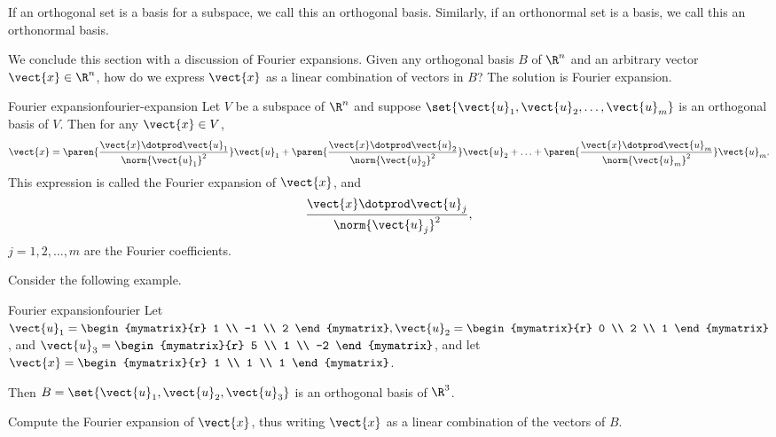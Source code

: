 If an orthogonal set is a basis for a subspace, we call this an
orthogonal basis. Similarly, if an orthonormal set is a basis, we call
this an orthonormal basis.

We conclude this section with a discussion of Fourier expansions. Given any orthogonal basis $B$ of $\R^n$ and an arbitrary vector $\vect{x} \in \R^n$, how do we express $\vect{x}$ as a linear combination of vectors in $B$? The solution is Fourier expansion. 

\begin{theorem}{Fourier expansion}{fourier-expansion}
Let $V$ be a subspace of $\R^n$ and suppose $\set{\vect{u}_1, \vect{u}_2, \ldots, \vect{u}_m}$
is an orthogonal basis of $V$. 
Then for any $\vect{x}\in V$,
\[ \vect{x} = 
\paren{\frac{\vect{x}\dotprod \vect{u}_1}{\norm{\vect{u}_1}^2}} \vect{u}_1 +
\paren{\frac{\vect{x}\dotprod \vect{u}_2}{\norm{\vect{u}_2}^2}} \vect{u}_2 +
\ldots +
\paren{\frac{\vect{x}\dotprod \vect{u}_m}{\norm{\vect{u}_m}^2}} \vect{u}_m.
\]
This expression is called the Fourier expansion 
of $\vect{x}$, and 
\[ \frac{\vect{x}\dotprod \vect{u}_j}{\norm{\vect{u}_j}^2},\]
$j=1,2,\ldots,m$
are the Fourier coefficients.
\end{theorem}

Consider the following example.

\begin{example}{Fourier expansion}{fourier}
Let
$\vect{u}_1= \begin{mymatrix}{r} 1 \\ -1 \\ 2 \end{mymatrix},
\vect{u}_2= \begin{mymatrix}{r} 0 \\ 2 \\ 1  \end{mymatrix}$,
and
$\vect{u}_3 =\begin{mymatrix}{r} 5 \\ 1 \\ -2 \end{mymatrix}$, 
and let 
$\vect{x} =\begin{mymatrix}{r} 1 \\ 1 \\ 1 \end{mymatrix}$.

Then $B=\set{\vect{u}_1, \vect{u}_2, \vect{u}_3}$
is an orthogonal basis of $\R^3$. 

Compute the Fourier expansion of $\vect{x}$, thus writing $\vect{x}$ as  a linear combination of the vectors of $B$. 
\end{example}

